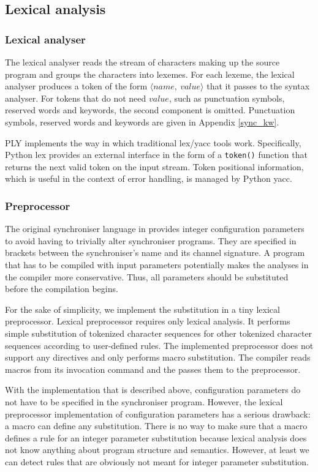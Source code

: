 \subsection{Lexical analysis}
  \subsubsection{Lexical analyser}
The lexical analyser reads the stream of characters making up the source program and groups the characters into lexemes. For each lexeme, the lexical analyser produces a token of the form $\langle name, \: value \rangle$ that it passes to the syntax analyser. For tokens that do not need $value$, such as punctuation symbols, reserved words and keywords, the second component is omitted. Punctuation symbols, reserved words and keywords are given in Appendix \ref{sync_kw}.

PLY implements the way in which traditional lex/yacc tools work. Specifically, Python lex provides an external interface in the form of a \texttt{token()} function that returns the next valid token on the input stream. Token positional information, which is useful in the context of error handling, is managed by Python yacc.

  \subsubsection{Preprocessor}
The original synchroniser language in \cite{astrakahn} provides integer configuration parameters to avoid having to trivially alter synchroniser programs. They are specified in brackets between the synchroniser's name and its channel signature. A program that has to be compiled with input parameters potentially makes the analyses in the compiler more conservative. Thus, all parameters should be substituted before the compilation begins.

For the sake of simplicity, we implement the substitution in a tiny lexical preprocessor. Lexical preprocessor requires only lexical analysis. It performs simple substitution of tokenized character sequences for other tokenized character sequences according to user-defined rules. The implemented preprocessor does not support any directives and only performs macro substitution. The compiler reads macros from its invocation command and the passes them to the preprocessor.

With the implementation that is described above, configuration parameters do not have to be specified in the synchroniser program. However, the lexical preprocessor implementation of configuration parameters has a serious drawback: a macro can define any substitution. There is no way to make sure that a macro defines a rule for an integer parameter substitution because lexical analysis does not know anything about program structure and semantics. However, at least we can detect rules that are obviously not meant for integer parameter substitution.

